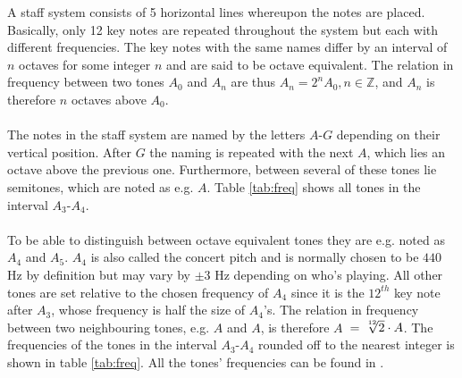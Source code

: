 \noindent
A staff system consists of 5 horizontal lines whereupon the notes are placed. Basically, only 12 key notes are repeated throughout the system but each with different frequencies. The key notes with the same names differ by an interval of $n$ octaves for some integer $n$ and are said to be octave equivalent. \cite{MusicTheory} The relation in frequency between two tones $A_0$ and $A_n$ are thus $A_n = 2^n A_0, n \in \mathbb{Z}$, and $A_n$ is therefore $n$ octaves above $A_0$.
\\ \\
The notes in the staff system are named by the letters $A$-$G$ depending on their vertical position. After $G$ the naming is repeated with the next $A$, which lies an octave above the previous one. Furthermore, between several of these tones lie semitones, which are noted as e.g. $A$\hashsharp{}. Table \ref{tab:freq} shows all tones in the interval $A_3$-$A_4$.
\\ \\
To be able to distinguish between octave equivalent tones they are e.g. noted as $A_4$ and $A_5$. $A_4$ is also called the concert pitch and is normally chosen to be $440$ Hz by definition but may vary by $\pm 3$ Hz depending on who's playing. All other tones are set relative to the chosen frequency of $A_4$ since it is the $12^{th}$ key note after $A_3$, whose frequency is half the size of $A_4$'s. The relation in frequency between two neighbouring tones, e.g. $A$ and $A$\hashsharp, is therefore $A$\hashsharp \ $= \sqrt[\leftroot{-2}\uproot{2}12]{2} \cdot A$. \cite{MusicTheory} The frequencies of the tones in the interval $A_3$-$A_4$ rounded off to the nearest integer is shown in table \ref{tab:freq}. All the tones' frequencies can be found in \cite{FreqsString}.
\\ \\
